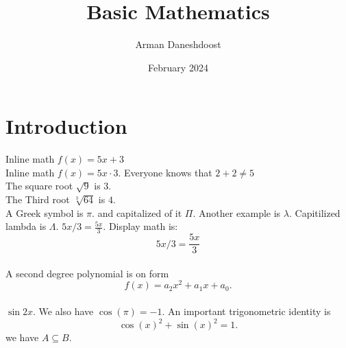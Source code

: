 \documentclass{article}
\title{Basic Mathematics}
\author{Arman Daneshdoost}
\date{February 2024}
\begin{document}
\maketitle

\section{Introduction}

Inline math $f(x) = 5x + 3$ %
\\
Inline math $f(x) = 5x \cdot 3$. Everyone knows that $2 + 2 \neq 5$ %
\\
The square root $\sqrt{9}$ is $3$.
\\
The Third root $\sqrt[3]{64}$ is $4$.
\\
A Greek symbol is $\pi$. and capitalized of it $\Pi$. Another example is $\lambda$. Capitilized lambda is $\Lambda$. $5x / 3 = \frac{5x}{3}$. Display math is: \[ 5x / 3 = \frac{5x}{3}\]
\\
A second degree polynomial is on form \[f(x) = a_{2}x^{2} + a_{1}x + a_{0}.\]
\\ %
$\sin{2x}$. We also have $\cos(\pi) = -1$. An important trigonometric identity is 
\[ \cos(x)^{2} + \sin(x)^{2} = 1.\]
we have $ A \subseteq B$.
\end{document}
